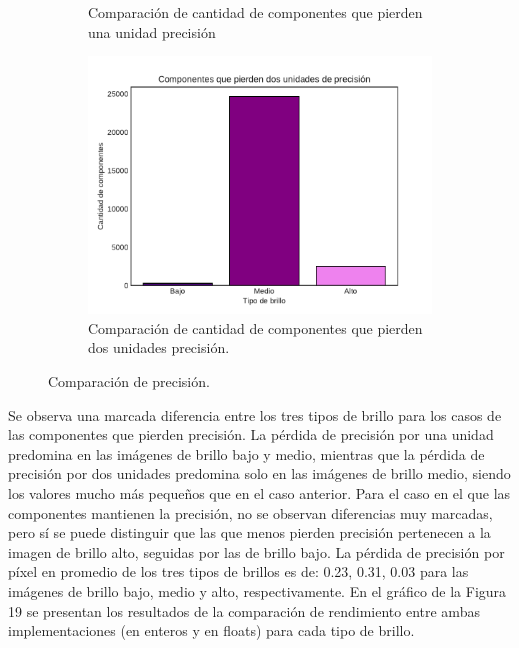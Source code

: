 \documentclass[a4paper]{article}
\begin{document}
\begin{figure}[b!]
\begin{subfigure}{0.49 \textwidth}
		\caption{Comparación de cantidad de componentes que pierden una unidad precisión}
	\end{subfigure}
	\begin{subfigure}{0.49 \textwidth}
		\centering
		\includegraphics[width=\textwidth]{img/Precision2.pdf}
		\caption{Comparación de cantidad de componentes que pierden dos unidades precisión.}
	\end{subfigure}
	\caption{Comparación de precisión.}
	\end{figure}


\justify
Se observa una marcada diferencia entre los tres tipos de brillo para los casos de las componentes que pierden precisión. La pérdida de precisión por una unidad predomina en las imágenes de brillo bajo y medio, mientras que la pérdida de precisión por dos unidades predomina solo en las imágenes de brillo medio, siendo los valores mucho más pequeños que en el caso anterior.
\justify
Para el caso en el que las componentes mantienen la precisión, no se observan diferencias muy marcadas, pero sí se puede distinguir que las que menos pierden precisión pertenecen a la imagen de brillo alto, seguidas por las de brillo bajo. La pérdida de precisión por píxel en promedio de los tres tipos de brillos es de: 0.23, 0.31, 0.03 para las imágenes de brillo bajo, medio y alto, respectivamente.
\justify
En el gráfico de la Figura 19 se presentan los resultados de la comparación de rendimiento entre ambas implementaciones (en enteros y en floats) para cada tipo de brillo. 
\end{document}
